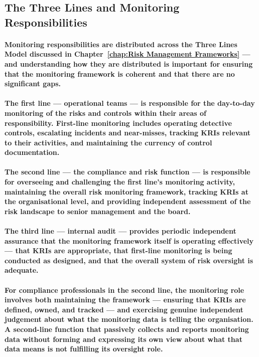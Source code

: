 \subsection{The Three Lines and Monitoring Responsibilities}
\paragraph{Monitoring responsibilities are distributed across the Three Lines Model discussed in Chapter~\ref{chap:Risk Management Frameworks} — and understanding how they are distributed is important for ensuring that the monitoring framework is coherent and that there are no significant gaps.}
\paragraph{\textbf{The first line} — operational teams — is responsible for the day-to-day monitoring of the risks and controls within their areas of responsibility. First-line monitoring includes operating detective controls, escalating incidents and near-misses, tracking KRIs relevant to their activities, and maintaining the currency of control documentation.}
\paragraph{\textbf{The second line} — the compliance and risk function — is responsible for overseeing and challenging the first line's monitoring activity, maintaining the overall risk monitoring framework, tracking KRIs at the organisational level, and providing independent assessment of the risk landscape to senior management and the board.}
\paragraph{\textbf{The third line} — internal audit — provides periodic independent assurance that the monitoring framework itself is operating effectively — that KRIs are appropriate, that first-line monitoring is being conducted as designed, and that the overall system of risk oversight is adequate.}
\paragraph{For compliance professionals in the second line, the monitoring role involves both maintaining the framework — ensuring that KRIs are defined, owned, and tracked — and exercising genuine independent judgement about what the monitoring data is telling the organisation. A second-line function that passively collects and reports monitoring data without forming and expressing its own view about what that data means is not fulfilling its oversight role.}

